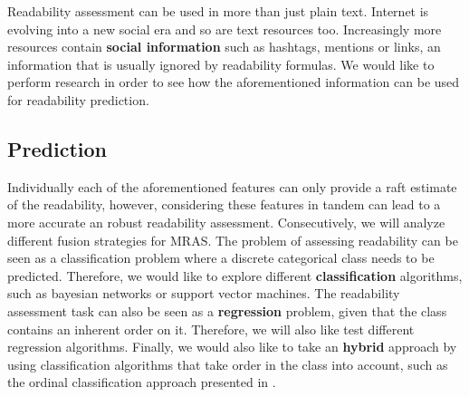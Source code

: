 \documentclass[12pt]{article}
\begin{document}
Readability assessment can be used in more than just plain text. Internet is evolving into a new social era and so are text resources too. Increasingly more resources contain \textbf{social information} such as hashtags, mentions or links, an information that is usually ignored by readability formulas. We would like to perform research in order to see how the aforementioned information can be used for readability prediction.




\subsection{Prediction}

Individually each of the aforementioned features can only provide a raft estimate of the readability, however, considering these features in tandem can lead to a more accurate an robust readability assessment. Consecutively, we will analyze different fusion strategies for MRAS. The problem of assessing readability can be seen as a classification problem where a discrete categorical class needs to be predicted. Therefore, we would like to  explore different \textbf{classification} algorithms, such as bayesian networks or support vector machines.  The readability assessment task can also be seen as a \textbf{regression} problem, given that the class contains an inherent order on it. Therefore, we will also like test different regression algorithms. Finally, we would also like to take an \textbf{hybrid} approach by using classification algorithms that take order in the class into account, such as the ordinal classification approach presented in \cite{frank2001simple}.
\end{document}
